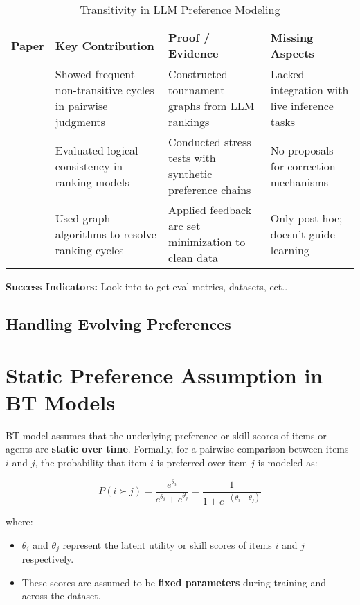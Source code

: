 \documentclass[sigconf]{acmart}
\begin{document}
\begin{table}[h]
\caption{Transitivity in LLM Preference Modeling}
\begin{adjustbox}{width=\linewidth}

\begin{tabular}{|p{1cm}|p{4cm}|p{4cm}|p{3cm}|}
\hline
\textbf{Paper} & \textbf{Key Contribution} & \textbf{Proof / Evidence} & \textbf{Missing Aspects} \\
\hline
\cite{tournament_graphs_to_clean_up_non_transitivity} & Showed frequent non-transitive cycles in pairwise judgments & Constructed tournament graphs from LLM rankings & Lacked integration with live inference tasks \\
\hline
\cite{non_transitivity_llm_evaluators_paper} & Evaluated logical consistency in ranking models & Conducted stress tests with synthetic preference chains & No proposals for correction mechanisms \\
\hline
\cite{tournament_graphs_to_clean_up_non_transitivity} & Used graph algorithms to resolve ranking cycles & Applied feedback arc set minimization to clean data & Only post-hoc; doesn't guide learning \\
\hline
\end{tabular}
\end{adjustbox}
\end{table}

\textbf{Success Indicators:} Look into \cite{non_transitivity_llm_evaluators_paper} to get eval metrics, datasets, ect.. 

\subsection{Handling Evolving Preferences}

\section*{Static Preference Assumption in BT Models}

BT model assumes that the underlying preference or skill scores of items or agents are \textbf{static over time}. Formally, for a pairwise comparison between items $i$ and $j$, the probability that item $i$ is preferred over item $j$ is modeled as:

\[
P(i \succ j) = \frac{e^{\theta_i}}{e^{\theta_i} + e^{\theta_j}} = \frac{1}{1 + e^{-(\theta_i - \theta_j)}}
\]

where:
\begin{itemize}
  \item $\theta_i$ and $\theta_j$ represent the latent utility or skill scores of items $i$ and $j$ respectively.
  \item These scores are assumed to be \textbf{fixed parameters} during training and across the dataset.
\end{itemize}
\end{document}

